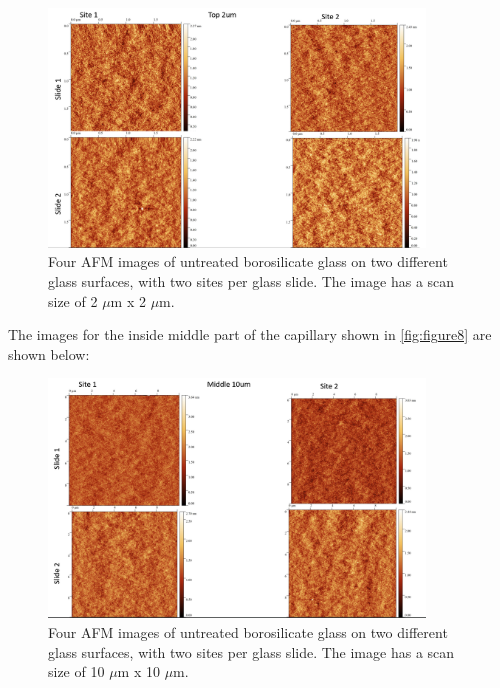 \begin{figure}[h!!!!]     %
        \begin{center}
          \includegraphics[width=100mm]{chapter3/Top 2um.png}
\end{center}
\caption{Four AFM images of untreated borosilicate glass on two different glass surfaces, with two sites per glass slide. The image has a scan size of 2 $\mu$m x 2 $\mu$m.}
\label{fig:figure9}                 %
\end{figure}   

\newpage
The images for the inside middle part of the capillary shown in \ref{fig:figure8} are shown below:

\begin{figure}[h!!!!]     %
        \begin{center}
          \includegraphics[width=100mm]{chapter3/mid 10um.png}
\end{center}
\caption{Four AFM images of untreated borosilicate glass on two different glass surfaces, with two sites per glass slide. The image has a scan size of 10 $\mu$m x 10 $\mu$m.}
\label{fig:figure9}                 %
\end{figure}   

